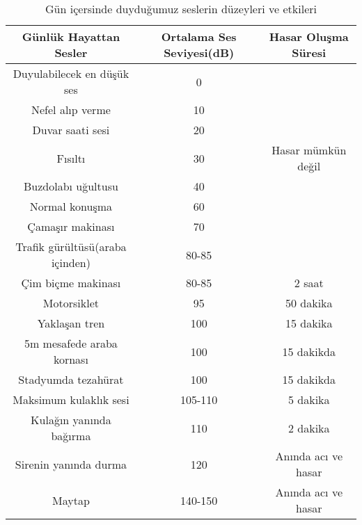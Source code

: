 \begin{table}[!ht]
\center
\begin{tabular}{c|c|c}
Günlük Hayattan Sesler & Ortalama Ses Seviyesi(dB) & Hasar Oluşma Süresi\\
\hline
Duyulabilecek en düşük ses & 0  \\
Nefel alıp verme & 10 \\
Duvar saati sesi & 20 \\
Fısıltı & 30 & Hasar mümkün değil\\
Buzdolabı uğultusu  & 40 & \\
Normal konuşma & 60\\
Çamaşır makinası & 70 & \\
Trafik gürültüsü(araba içinden) & 80-85 \\
\hline
Çim biçme makinası & 80-85 & 2 saat\\
Motorsiklet & 95 & 50 dakika\\
Yaklaşan tren & 100 & 15 dakika \\
5m mesafede araba kornası & 100 & 15 dakikda\\
Stadyumda tezahürat & 100 & 15 dakikda\\
\hline
Maksimum kulaklık sesi & 105-110 & 5 dakika\\
Kulağın yanında bağırma & 110 & 2 dakika \\
Sirenin yanında durma & 120 & Anında acı ve hasar\\
Maytap & 140-150 & Anında acı ve hasar\\

\end{tabular}
\caption{Gün içersinde duyduğumuz seslerin düzeyleri ve etkileri \cite{cdcwebsite}}
\label{tab:daily_db}
\end{table}



